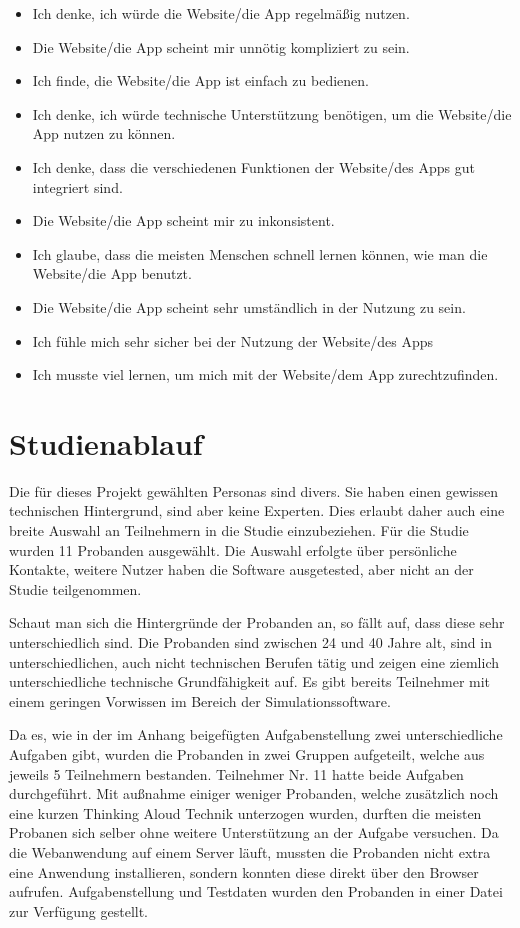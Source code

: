 \begin{itemize}
\label{itm:sus_questions}
    \item Ich denke, ich würde die Website/die App regelmäßig nutzen.
    \item Die Website/die App scheint mir unnötig kompliziert zu sein.
    \item Ich finde, die Website/die App ist einfach zu bedienen.
    \item Ich denke, ich würde technische Unterstützung benötigen, um die Website/die App nutzen zu können.
    \item Ich denke, dass die verschiedenen Funktionen der Website/des Apps gut integriert sind.
    \item Die Website/die App scheint mir zu inkonsistent.
    \item Ich glaube, dass die meisten Menschen schnell lernen können, wie man die Website/die App benutzt.
    \item Die Website/die App scheint sehr umständlich in der Nutzung zu sein.
    \item Ich fühle mich sehr sicher bei der Nutzung der Website/des Apps
    \item Ich musste viel lernen, um mich mit der Website/dem App zurechtzufinden.
\end{itemize}


\section{Studienablauf}
\label{sec:study_process}
Die für dieses Projekt gewählten Personas sind divers. Sie haben einen gewissen technischen Hintergrund, sind aber keine Experten. 
Dies erlaubt daher auch eine breite Auswahl an Teilnehmern in die Studie einzubeziehen.
Für die Studie wurden 11 Probanden ausgewählt. Die Auswahl erfolgte über persönliche Kontakte, weitere Nutzer haben die Software ausgetested, aber nicht an der Studie teilgenommen.

Schaut man sich die Hintergründe der Probanden an, so fällt auf, dass diese sehr unterschiedlich sind. Die Probanden sind zwischen 24 und 40 Jahre alt, sind in unterschiedlichen, auch nicht technischen Berufen tätig und zeigen eine ziemlich unterschiedliche technische Grundfähigkeit auf.
Es gibt bereits Teilnehmer mit einem geringen Vorwissen im Bereich der Simulationssoftware.

Da es, wie in der im Anhang beigefügten Aufgabenstellung zwei unterschiedliche Aufgaben gibt, wurden die Probanden in zwei Gruppen aufgeteilt, welche aus jeweils 5 Teilnehmern bestanden.
Teilnehmer Nr. 11 hatte beide Aufgaben durchgeführt. 
Mit außnahme einiger weniger Probanden, welche zusätzlich noch eine kurzen Thinking Aloud Technik unterzogen wurden, durften die meisten Probanen sich selber ohne weitere Unterstützung an der Aufgabe versuchen.
Da die Webanwendung auf einem Server läuft, mussten die Probanden nicht extra eine Anwendung installieren, sondern konnten diese direkt über den Browser aufrufen. Aufgabenstellung und Testdaten wurden den Probanden in einer Datei zur Verfügung gestellt.


